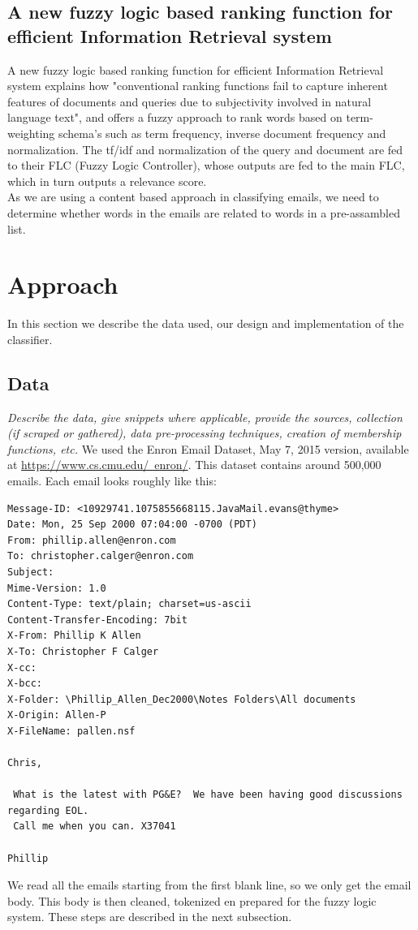 \documentclass[journal]{IEEEtran}
\begin{document}
\subsection{A new fuzzy logic based ranking function for efficient Information Retrieval system}

A new fuzzy logic based ranking function for efficient Information Retrieval system \cite{ranking} explains how "conventional ranking functions
fail to capture inherent features of documents and queries due to subjectivity
involved in natural language text", and offers a fuzzy approach to rank words
based on term-weighting schema's such as term frequency, inverse document
frequency and normalization. The tf/idf and normalization of the query and document are fed to their FLC (Fuzzy Logic Controller), whose outputs are fed to the main FLC, which in turn outputs a relevance score. \\

As we are using a content based approach in classifying emails, we need to determine whether words in the emails are related to words in a pre-assambled list.

\section{Approach}
In this section we describe the data used, our design and implementation of the classifier.

\subsection{Data}
\textit{Describe the data, give snippets where applicable, provide the
sources, collection (if scraped or gathered), data pre-processing techniques,
creation of membership functions, etc.}
We used the Enron Email Dataset, May 7, 2015 version, available at \href{https://www.cs.cmu.edu/~enron/}{https://www.cs.cmu.edu/~enron/}. This dataset contains around 500,000 emails. Each email looks roughly like this:
\begin{lstlisting}
Message-ID: <10929741.1075855668115.JavaMail.evans@thyme>
Date: Mon, 25 Sep 2000 07:04:00 -0700 (PDT)
From: phillip.allen@enron.com
To: christopher.calger@enron.com
Subject: 
Mime-Version: 1.0
Content-Type: text/plain; charset=us-ascii
Content-Transfer-Encoding: 7bit
X-From: Phillip K Allen
X-To: Christopher F Calger
X-cc: 
X-bcc: 
X-Folder: \Phillip_Allen_Dec2000\Notes Folders\All documents
X-Origin: Allen-P
X-FileName: pallen.nsf

Chris,

 What is the latest with PG&E?  We have been having good discussions 
regarding EOL.
 Call me when you can. X37041

Phillip
\end{lstlisting}
We read all the emails starting from the first blank line, so we only get the email body. This body is then cleaned, tokenized en prepared for the fuzzy logic system. These steps are described in the next subsection.
\end{document}
